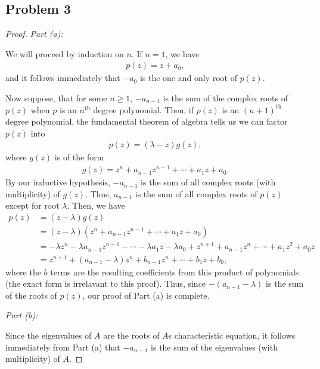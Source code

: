 \documentclass[10pt,a4paper]{article}
\makeatletter
\newcommand{\proofpart}[2]{%
  \par
  \addvspace{\medskipamount}%
  \noindent\emph{Part #1: #2}\par\nobreak
  \addvspace{\smallskipamount}%
  \@afterheading
}
\theoremstyle{definition}
\makeatother
\begin{document}
\subsection*{Problem 3}
\begin{proof}
\proofpart{(a)}{} We will proceed by induction on $n$. If $n = 1$, we have
\begin{align*}
p(z) = z + a_0,
\end{align*}
and it follows immediately that $-a_0$ is the one and only root of $p(z)$.

Now suppose, that for some $n \geq 1$, $-a_{n-1}$ is the sum of the complex roots of $p(z)$ when $p$ is an $n^{\text{th}}$ degree polynomial. Then, if $p(z)$ is an $(n+1)^{\text{th}}$ degree polynomial, the fundamental theorem of  algebra tells us we can factor $p(z)$ into
\begin{align*}
p(z) = (\lambda - z)g(z),
\end{align*}
where $g(z)$ is of the form
\begin{align*}
g(z) = z^n + a_{n-1}z^{n-1} + \cdots + a_1 z + a_0.
\end{align*}
By our inductive hypothesis, $-a_{n-1}$ is the sum of all complex roots (with multiplicity) of $g(z)$. Thus, $a_{n-1}$ is the sum of all complex roots of $p(z)$ except for root $\lambda$. Then, we have
\begin{align*}
p(z) &= (z - \lambda)g(z)\\
&= (z - \lambda)(z^n + a_{n-1}z^{n-1} + \cdots + a_1 z + a_0)\\
&= -\lambda z^n - \lambda a_{n-1}z^{n-1} - \cdots - \lambda a_1 z -  \lambda a_0 + z^{n+1} + a_{n-1}z^{n} + \cdots + a_1 z^2 + a_0z\\
&= z^{n+1} + (a_{n-1} - \lambda)z^n + b_{n-1}z^n + \cdots + b_1 z + b_0,
\end{align*}
where the $b$ terms are the resulting coefficients from this product of polynomials (the exact form is irrelavant to this proof). Thus, since $-(a_{n-1} - \lambda)$ is the sum of the roots of $p(z)$, our proof of Part (a) is complete.

\proofpart{(b)}{} Since the eigenvalues of $A$ are the roots of $A$s characteristic equation, it follows immediately from Part (a) that $-a_{n-1}$ is the sum of the eigenvalues (with multiplicity) of $A$.


\end{proof}
\end{document}
